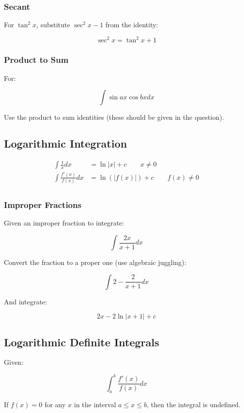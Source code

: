 \documentclass[a4paper,11pt]{report}
\begin{document}
\subsubsection{Secant}

For $\tan^2{x}$, substitute $\sec^2{x} - 1$ from the identity:

$$
\sec^2{x} = \tan^2{x} + 1
$$

\subsubsection{Product to Sum}

For:

$$
\int \sin{ax}\cos{bx} dx
$$

Use the product to sum identities (these should be given in the question).

\subsection{Logarithmic Integration}

$$
\begin{aligned}
\int \frac{1}{x} dx & = \ln{|x|} + c \qquad x \neq 0 \\
\int \frac{f'(x)}{f(x)} dx & = \ln(|f(x)|) + c \qquad f(x) \neq 0 \\
\end{aligned}
$$
\subsubsection{Improper Fractions}

Given an improper fraction to integrate:

$$
\int \frac{2x}{x + 1} dx
$$

Convert the fraction to a proper one (use algebraic juggling):

$$
\int 2 - \frac{2}{x + 1} dx
$$

And integrate:

$$
2x - 2\ln{|x + 1|} + c
$$

\subsection{Logarithmic Definite Integrals}

Given:

$$
\int_a^b \frac{f'(x)}{f(x)} dx
$$

If $f(x) = 0$ for any $x$ in the interval $a \leq x \leq b$, then the integral
is undefined.
\end{document}
